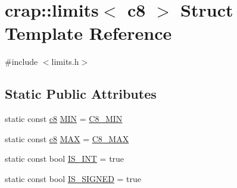 \hypertarget{structcrap_1_1limits_3_01c8_01_4}{\section{crap\-:\-:limits$<$ c8 $>$ Struct Template Reference}
\label{structcrap_1_1limits_3_01c8_01_4}
}


{\ttfamily \#include $<$limits.\-h$>$}

\subsection*{Static Public Attributes}
\begin{DoxyCompactItemize}
\item 
static const \hyperlink{types_8h_aa1ba8aac9fcd831012308297336ac74b}{c8} \hyperlink{structcrap_1_1limits_3_01c8_01_4_a7cbf9e8356893e0dab215fa806292eae}{M\-I\-N} = \hyperlink{types_8h_a63e3b96e96c8d46bd4102e65f7290593}{C8\-\_\-\-M\-I\-N}
\item 
static const \hyperlink{types_8h_aa1ba8aac9fcd831012308297336ac74b}{c8} \hyperlink{structcrap_1_1limits_3_01c8_01_4_a97ae99a3786f3d5189299535e582bba8}{M\-A\-X} = \hyperlink{types_8h_ab7e171d4e3b49012ebe10417b37db364}{C8\-\_\-\-M\-A\-X}
\item 
static const bool \hyperlink{structcrap_1_1limits_3_01c8_01_4_ae087ab07a112eab4e5f69286779f86b0}{I\-S\-\_\-\-I\-N\-T} = true
\item 
static const bool \hyperlink{structcrap_1_1limits_3_01c8_01_4_ae0dc730a91615cd843450f9ae8da1c4b}{I\-S\-\_\-\-S\-I\-G\-N\-E\-D} = true
\end{DoxyCompactItemize}


